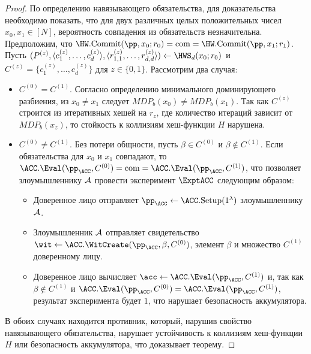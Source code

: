 \begin{proof}
	По определению навязывающего обязательства, для доказательства необходимо показать, что для двух различных целых положительных чисел $x_0, x_1 \in [N]$, вероятность совпадения из обязательств незначительна.
	Предположим, что $\HW.\Commit(\pp, x_0; r_0) = \com = \HW.\Commit(\pp, x_1; r_1)$.
	Пусть $(P^{(z)}, \langle c_1^{(z)}, \dots, c_d^{(z)} \rangle, \langle r_{1, 1}^{(z)}, \dots, r_{d, d}^{(z)} \rangle) \leftarrow \HWS_d(x_0; r_0)$ и $C^{(z)} = \{c_1^{(z)}, \dots, c_d^{(z)}\}$ для $z \in \{0, 1\}$.
	Рассмотрим два случая:
	\begin{itemize}
		\item $C^{(0)} = C^{(1)}$. Согласно определению минимального доминирующего разбиения, из $x_0 \neq x_1$ следует $MDP_b(x_0) \neq MDP_b(x_1)$. Так как $C^{(z)}$ строится из итеративных хешей на $r_z$, где количество итераций зависит от $MDP_b(x_z)$, то стойкость к коллизиям хеш-функции $H$ нарушена.
		\item $C^{(0)} \neq C^{(1)}$. Без потери общности, пусть $\beta \in C^{(0)}$ и $\beta \notin C^{(1)}$. Если обязательства для $x_0$ и $x_1$ совпадают, то $\ACC.\Eval(\pp_\ACC, C^{(0)}) = \com = \ACC.\Eval(\pp_\ACC, C^{(1)})$, что позволяет злоумышленнику $\mathcal{A}$ провести эксперимент $\ExptACC$ следующим образом:
		\begin{itemize}
			\item Доверенное лицо отправляет $\pp_\ACC \leftarrow \ACC.\Setup(1^\lambda)$ злоумышленнику $\mathcal{A}$.
			\item Злоумышленник $\mathcal{A}$ отправляет свидетельство $\wit \leftarrow \ACC.\WitCreate(\pp_\ACC, \beta, C^{(0)})$, элемент $\beta$ и множество $C^{(1)}$ доверенному лицу.
			\item Доверенное лицо вычисляет $\acc \leftarrow \ACC.\Eval(\pp_\ACC, C^{(1)})$ и, так как $\beta \notin C^{(1)}$ и $\ACC.\Eval(\pp_\ACC, C^{(0)}) = \ACC.\Eval(\pp_\ACC, C^{(1)})$, результат эксперимента будет $1$, что нарушает безопасность аккумулятора.
		\end{itemize}
	\end{itemize}
	В обоих случаях находится противник, который, нарушив свойство навязывающего обязательства, нарушает устойчивость к коллизиям хеш-функции $H$ или безопасность аккумулятора, что доказывает теорему.
\end{proof}

